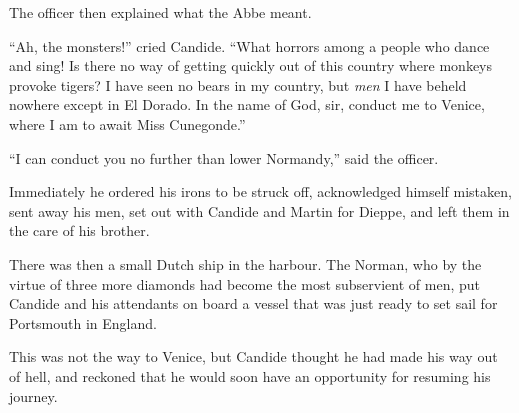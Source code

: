 The officer then explained what the Abbe meant.

``Ah, the monsters!'' cried Candide. ``What horrors among a people who dance and sing! Is there no way of getting quickly out of this country where monkeys provoke tigers? I have seen no bears in my country, but \textit{men} I have beheld nowhere except in El Dorado. In the name of God, sir, conduct me to Venice, where I am to await Miss Cunegonde.''

``I can conduct you no further than lower Normandy,'' said the officer.

Immediately he ordered his irons to be struck off, acknowledged himself mistaken, sent away his men, set out with Candide and Martin for Dieppe, and left them in the care of his brother.

There was then a small Dutch ship in the harbour. The Norman, who by the virtue of three more diamonds had become the most subservient of men, put Candide and his attendants on board a vessel that was just ready to set sail for Portsmouth in England.

This was not the way to Venice, but Candide thought he had made his way out of hell, and reckoned that he would soon have an opportunity for resuming his journey.

